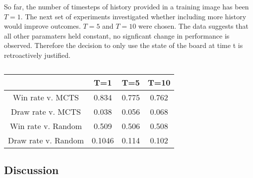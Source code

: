 \documentclass[twoside,11pt]{article}
\begin{document}

So far, the number of timesteps of history provided in a training image has been $T=1$. 
The next set of experiments investigated whether including more history would improve
outcomes. $T=5$ and $T=10$ were chosen. The data suggests that all other paramaters held
constant, no signficant change in performance is observed. Therefore the decision to only use
the state of the board at time t is retroactively justified.

\begin{table}[ht]
    \caption{}
\begin{center}
    \begin{tabular}{||c c c c||} 
    \hline
     & T=1 & T=5 & T=10 \\ [0.5ex] 
    \hline\hline
    Win rate v. MCTS & 0.834  & 0.775 & 0.762 \\ 
    \hline
    Draw rate v. MCTS &  0.038  & 0.056 & 0.068 \\
    \hline
    Win rate v. Random &  0.509 & 0.506 & 0.508\\
    \hline
    Draw rate v. Random & 0.1046 & 0.114 & 0.102 \\
    \hline
   \end{tabular}
   \end{center}
\end{table}




\subsection{Discussion}







\newpage


\vskip 0.2in


\end{document}
